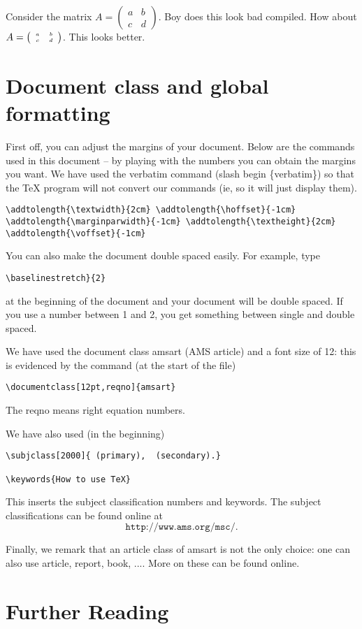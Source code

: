 \documentclass[12pt,reqno]{amsart}
\newcommand{\mattwo}[4]
{\left(\begin{array}{cc}
                        #1  & #2   \\
                        #3 &  #4
                          \end{array}\right) }
\numberwithin{equation}{section}
\begin{document}
Consider the matrix $A = \mattwo{a}{b}{c}{d}$. Boy does this look
bad compiled. How about $A = \tiny \mattwo{a}{b}{c}{d}$. This
looks better.


\section{Document class and global formatting}

First off, you can adjust the margins of your document. Below are
the commands used in this document -- by playing with the numbers
you can obtain the margins you want. We have used the verbatim
command (slash begin \{verbatim\}) so that the TeX program will not
convert our commands (ie, so it will just display them).

\begin{verbatim}
\addtolength{\textwidth}{2cm} \addtolength{\hoffset}{-1cm}
\addtolength{\marginparwidth}{-1cm} \addtolength{\textheight}{2cm}
\addtolength{\voffset}{-1cm}

\end{verbatim}

You can also make the document double spaced easily. For example,
type
\begin{verbatim}\baselinestretch}{2}\end{verbatim} at the beginning
of the document and your document will be double spaced. If you use
a number between 1 and 2, you get something between single and
double spaced.

We have used the document class amsart (AMS article) and a font size
of 12: this is evidenced by the command (at the start of the file)
\begin{verbatim}\documentclass[12pt,reqno]{amsart}\end{verbatim}
The reqno means right equation numbers.

We have also used (in the beginning) \begin{verbatim}
\subjclass[2000]{ (primary),  (secondary).}

\keywords{How to use TeX}
\end{verbatim}

This inserts the subject classification numbers and keywords. The
subject classifications can be found online at
$$\texttt{http://www.ams.org/msc/}.$$

Finally, we remark that an article class of amsart is not the only
choice: one can also use article, report, book, .... More on these
can be found online.

\section{Further Reading}
\end{document}
